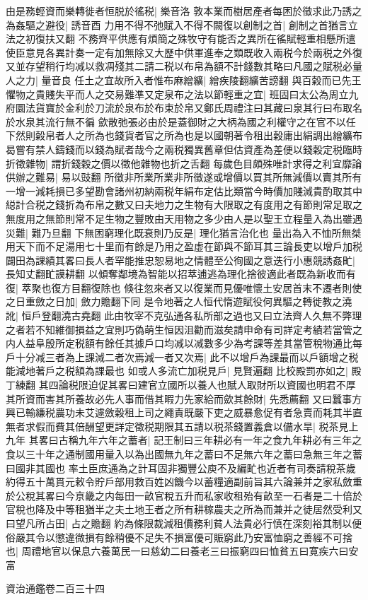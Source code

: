 由是務輕資而樂轉徙者恒脱於徭税|{
	樂音洛}
敦本業而樹居產者每困於徵求此乃誘之為姦驅之避役|{
	誘音酉}
力用不得不弛賦入不得不闕復以創制之首|{
	創制之首猶言立法之初復扶又翻}
不務齊平供應有煩簡之殊牧守有能否之異所在徭賦輕重相懸所遣使臣意見各異計奏一定有加無除又大歷中供軍進奉之類既收入兩税今於兩税之外復又並存望稍行均减以救凋殘其二請二税以布帛為額不計錢數其略曰凡國之賦税必量人之力|{
	量音良}
任土之宜故所入者惟布麻繒纊|{
	繒疾陵翻纊苦謗翻}
與百糓而已先王懼物之貴賤失平而人之交易難凖又定泉布之法以節輕重之宜|{
	班固曰太公為周立九府圜法貨寶於金利於刀流於泉布於布束於帛又鄭氏周禮注曰其藏曰泉其行曰布取名於水泉其流行無不徧}
歛散弛張必由於是蓋御財之大柄為國之利權守之在官不以任下然則糓帛者人之所為也錢貨者官之所為也是以國朝著令租出穀庸出絹調出繒纊布曷嘗有禁人鑄錢而以錢為賦者哉今之兩税獨異舊章但估資產為差便以錢穀定税臨時折徵雜物|{
	謂折錢穀之價以徵他雜物也折之舌翻}
每歲色目頗殊唯計求得之利宜靡論供辦之難易|{
	易以豉翻}
所徵非所業所業非所徵遂或增價以買其所無減價以賣其所有一增一減耗損已多望勘會諸州初納兩税年絹布定估比類當今時價加賤減貴酌取其中縂計合税之錢折為布帛之數又曰夫地力之生物有大限取之有度用之有節則常足取之無度用之無節則常不足生物之豐敗由天用物之多少由人是以聖王立程量入為出雖遇災難|{
	難乃旦翻}
下無困窮理化既衰則乃反是|{
	理化猶言治化也}
量出為入不恤所無桀用天下而不足湯用七十里而有餘是乃用之盈虚在節與不節耳其三論長吏以增戶加税闢田為課績其畧曰長人者罕能推忠恕易地之情體至公徇國之意迭行小惠競誘姦甿|{
	長知丈翻甿謨耕翻}
以傾奪鄰境為智能以招萃逋逃為理化捨彼適此者既為新收而有復|{
	萃聚也復方目翻復除也}
倏往忽來者又以復業而見優唯懷土安居首末不遷者則使之日重斂之日加|{
	斂力贍翻下同}
是令地著之人恒代惰遊賦役何異驅之轉徙教之澆訛|{
	恒戶登翻澆古堯翻}
此由牧宰不克弘通各私所部之過也又曰立法齊人久無不弊理之者若不知維御損益之宜則巧偽萌生恒因沮勸而滋矣請申命有司詳定考績若當管之内人益阜殷所定税額有餘任其據戶口均减以减數多少為考課等差其當管稅物通比每戶十分减三者為上課減二者次焉減一者又次焉|{
	此不以增戶為課最而以戶額增之税能減地著戶之税額為課最也}
如或人多流亡加税見戶|{
	見賢遍翻}
比校殿罰亦如之|{
	殿丁練翻}
其四論税限迫促其畧曰建官立國所以養人也賦人取財所以資國也明君不厚其所資而害其所養故必先人事而借其暇力先家給而歛其餘財|{
	先悉薦翻}
又曰蠶事方興已輸縑税農功未艾遽斂穀租上司之繩責既嚴下吏之威暴愈促有者急賣而耗其半直無者求假而費其倍酬望更詳定徵税期限其五請以税茶錢置義倉以備水旱|{
	税茶見上九年}
其畧曰古稱九年六年之蓄者|{
	記王制曰三年耕必有一年之食九年耕必有三年之食以三十年之通制國用量入以為出國無九年之蓄曰不足無六年之蓄曰急無三年之蓄曰國非其國也}
率土臣庶通為之計耳固非獨豐公庾不及編甿也近者有司奏請稅茶歲約得五十萬貫元敕令貯戶部用救百姓凶饑今以蓄糧適副前旨其六論兼并之家私斂重於公稅其畧曰今亰畿之内每田一畝官稅五升而私家收租殆有畝至一石者是二十倍於官稅也降及中等租猶半之夫土地王者之所有耕稼農夫之所為而兼并之徒居然受利又曰望凡所占田|{
	占之贍翻}
約為條限裁減租價務利貧人法貴必行慎在深刻裕其制以便俗嚴其令以懲違微損有餘稍優不足失不損富優可賑窮此乃安富恤窮之善經不可捨也|{
	周禮地官以保息六養萬民一曰慈幼二曰養老三曰振窮四曰恤貧五曰寛疾六曰安富}


資治通鑑卷二百三十四

